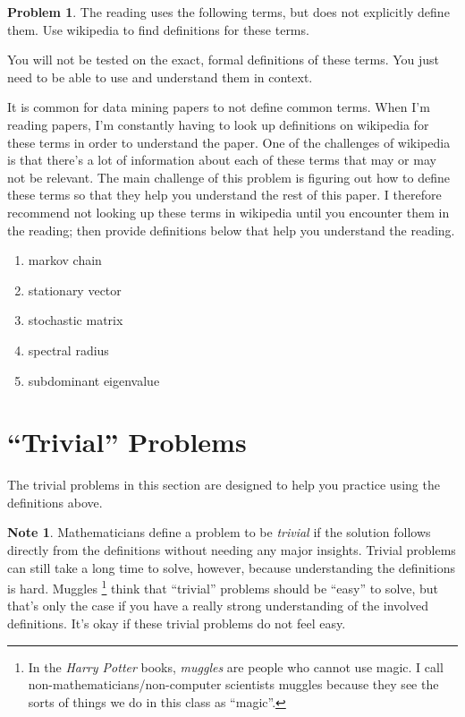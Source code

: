 \documentclass[10pt]{article}
\theoremstyle{definition}
\newtheorem{problem}{Problem}
\newtheorem{note}{Note}
\begin{document}
\newpage
\begin{problem}
    The reading uses the following terms,
    but does not explicitly define them.
    Use wikipedia to find definitions for these terms.

    You will not be tested on the exact, formal definitions of these terms.
    You just need to be able to use and understand them in context.

It is common for data mining papers to not define common terms.
When I'm reading papers, I'm constantly having to look up definitions on wikipedia for these terms in order to understand the paper.
One of the challenges of wikipedia is that there's a lot of information about each of these terms that may or may not be relevant.
The main challenge of this problem is figuring out how to define these terms so that they help you understand the rest of this paper.
I therefore recommend not looking up these terms in wikipedia until you encounter them in the reading;
then provide definitions below that help you understand the reading.

    \begin{enumerate}
        \item markov chain
            \vspace{2.5in}
        \item stationary vector
            \vspace{2.5in}
        \item stochastic matrix
            \vspace{2.5in}
        \item spectral radius
            \vspace{2.5in}
        \item subdominant eigenvalue
    \end{enumerate}
\end{problem}

\newpage
\section{``Trivial'' Problems}
The trivial problems in this section are designed to help you practice using the definitions above.

\begin{note}
Mathematicians define a problem to be \emph{trivial} if the solution follows directly from the definitions without needing any major insights.
Trivial problems can still take a long time to solve, however, because understanding the definitions is hard.
Muggles%
\footnote{In the \emph{Harry Potter} books, \emph{muggles} are people who cannot use magic.
I call non-mathematicians/non-computer scientists muggles because they see the sorts of things we do in this class as ``magic''.}
think that ``trivial'' problems should be ``easy'' to solve,
but that's only the case if you have a really strong understanding of the involved definitions.
It's okay if these trivial problems do not feel easy.
\end{note}
\end{document}
